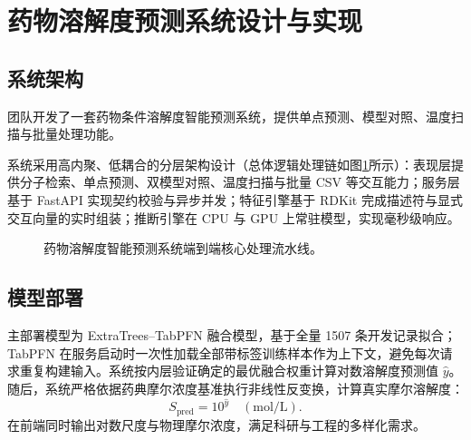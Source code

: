 \section{药物溶解度预测系统设计与实现}\label{sec:v2-application}

\subsection{系统架构}

团队开发了一套药物条件溶解度智能预测系统，提供单点预测、模型对照、温度扫描与批量处理功能。

系统采用高内聚、低耦合的分层架构设计（总体逻辑处理链如图\ref{fig:v2-app-flow}所示）：表现层提供分子检索、单点预测、双模型对照、温度扫描与批量 CSV 等交互能力；服务层基于 FastAPI 实现契约校验与异步并发；特征引擎基于 RDKit 完成描述符与显式交互向量的实时组装；推断引擎在 CPU 与 GPU 上常驻模型，实现毫秒级响应。

\begin{figure}[htbp]
\centering
{}
\caption{药物溶解度智能预测系统端到端核心处理流水线。}
\label{fig:v2-app-flow}
\end{figure}

\subsection{模型部署}

主部署模型为 ExtraTrees--TabPFN 融合模型，基于全量 1507 条开发记录拟合；TabPFN 在服务启动时一次性加载全部带标签训练样本作为上下文，避免每次请求重复构建输入。系统按内层验证确定的最优融合权重计算对数溶解度预测值 $\widehat y$。随后，系统严格依据药典摩尔浓度基准执行非线性反变换，计算真实摩尔溶解度：
\begin{equation}
S_{\mathrm{pred}} = 10^{\widehat y} \quad (\mathrm{mol/L}).
\end{equation}
在前端同时输出对数尺度与物理摩尔浓度，满足科研与工程的多样化需求。

